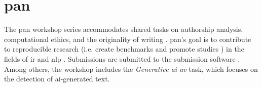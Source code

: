 \section{\acs{pan}}
\label{sec:pan}

The \ac{pan} workshop series accommodates shared tasks %
on authorship analysis, computational ethics, and the originality of writing \citep{ayele_overview_2024}.
\ac{pan}'s goal is to contribute to reproducible research (i.e. create benchmarks and promote studies \citep{kocher_unine_2015}) 
in the fields of \ac{ir} and \ac{nlp} \citep{ayele_overview_2024}.
Submissions are submitted to the submission software \tira{}.
Among others, the workshop includes the \textit{Generative \ac{ai} \ac{av}} task, 
which focuses on the detection of \ac{ai}-generated text.

